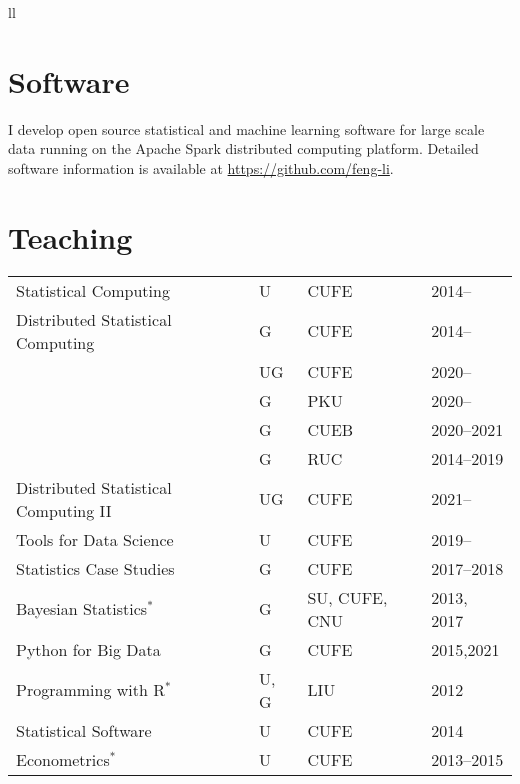 \documentclass[twoside,a4paper,10.5pt]{article}
\begin{document}
\begin{tabular}{ll}
\section*{Software}
I develop open source statistical and machine learning software for large scale data running on the Apache Spark distributed computing platform. Detailed software information is available at \url{https://github.com/feng-li}.

\section*{Teaching}
\begin{center}
  \begin{tabular}{p{6.5cm}lll}
    \toprule
  {Statistical Computing}                & U    & CUFE          & 2014--     \\
  {Distributed Statistical Computing}    & G    & CUFE          & 2014--     \\
                                         & UG   & CUFE          & 2020--     \\
                                         & G    & PKU           & 2020--     \\
                                         & G    & CUEB          & 2020--2021 \\
                                         & G    & RUC           & 2014--2019 \\
  {Distributed Statistical Computing II} & UG   & CUFE          & 2021--     \\
  {Tools for Data Science}               & U    & CUFE          & 2019--     \\
  {Statistics Case Studies}              & G    & CUFE          & 2017--2018 \\
  {Bayesian Statistics}$^*$              & G    & SU, CUFE, CNU & 2013, 2017 \\
  {Python for Big Data}                  & G    & CUFE          & 2015,2021  \\
  {Programming with R}$^*$               & U, G & LIU           & 2012       \\
  {Statistical Software}                 & U    & CUFE          & 2014       \\
  {Econometrics}$^*$                     & U    & CUFE          & 2013--2015 \\

\end{tabular}
\end{center}
\end{tabular}
\end{document}
